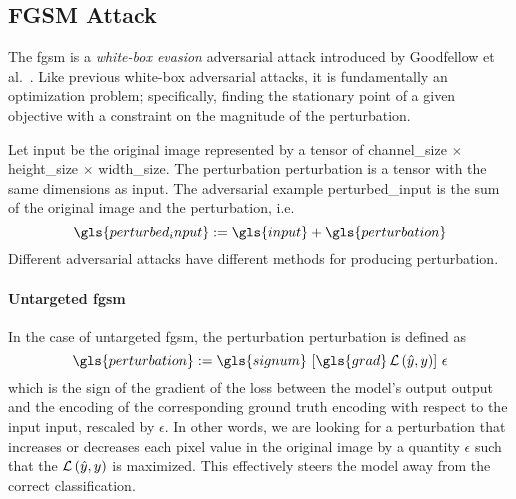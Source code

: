 \subsection{FGSM Attack}
\label{subsec:fgsm-attack}

The \acrfull{fgsm} is a \emph{white-box evasion} adversarial attack introduced by Goodfellow et al.~\cite{ExplainingAndGoodfe2014}. Like previous white-box adversarial attacks, it is fundamentally an optimization problem; specifically, finding the stationary point of a given objective with a constraint on the magnitude of the perturbation.

Let \gls{input} be the original image represented by a tensor of \gls{channel_size} $\times$ \gls{height_size} $\times$ \gls{width_size}.
The perturbation \gls{perturbation} is a tensor with the same dimensions as \gls{input}. The adversarial example \gls{perturbed_input} is the sum of the original image and the perturbation, i.e.
\begin{equation}
  \gls{perturbed_input} := \gls{input} + \gls{perturbation}
  \label{eq:perturbed-input}
\end{equation}
Different adversarial attacks have different methods for producing \gls{perturbation}.

\paragraph{Untargeted \acrshort{fgsm}} In the case of untargeted \acrshort{fgsm}, the perturbation \gls{perturbation} is defined as
\begin{equation}
  \gls{perturbation} :=
  \gls{signum} \, \left[\gls{grad} \Loss\left(\hat{y}, y\right)\right] \, \epsilon
  \label{eq:untargeted-perturbation}
\end{equation}
which is the sign of the gradient of the loss between the model's output \gls{output} and the encoding of the corresponding ground truth \gls{encoding} with respect to the input \gls{input}, rescaled by $\epsilon$. In other words, we are looking for a perturbation that increases or decreases each pixel value in the original image by a quantity $\epsilon$ such that the $\operatorname{\mathcal{L}}\left(\hat{y}, y\right)$ is maximized. This effectively steers the model away from the correct classification.

